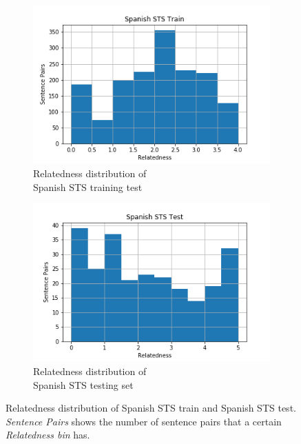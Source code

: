 \begin{enumerate}
\begin{figure}
	\captionsetup[subfigure]{justification=centering}
	\centering
	\begin{subfigure}[b]{.5\textwidth}
		\centering
		\includegraphics[width=\textwidth]{figures/semantic_textual_similarity/introduction/sts_spanish_train.png}
		\caption{Relatedness distribution of \\ Spanish STS  training test}
		\label{fig:spanish_train_relatedness}
	\end{subfigure}%
	\begin{subfigure}[b]{.5\textwidth}
		\centering
		\includegraphics[width=\textwidth]{figures/semantic_textual_similarity/introduction/sts_spanish_test.png}
		\caption{Relatedness distribution of \\ Spanish STS  testing set}
		\label{fig:spanish_test_relatedness}
	\end{subfigure}
	\caption[Relatedness distribution of Spanish STS train and Spanish STS test]{Relatedness distribution of Spanish STS train and Spanish STS test. \textit{Sentence Pairs} shows the number of sentence pairs that a certain \textit{Relatedness bin} has.}
	\label{fig:spanish_sts_relatedness}
\end{figure}



\end{enumerate}
